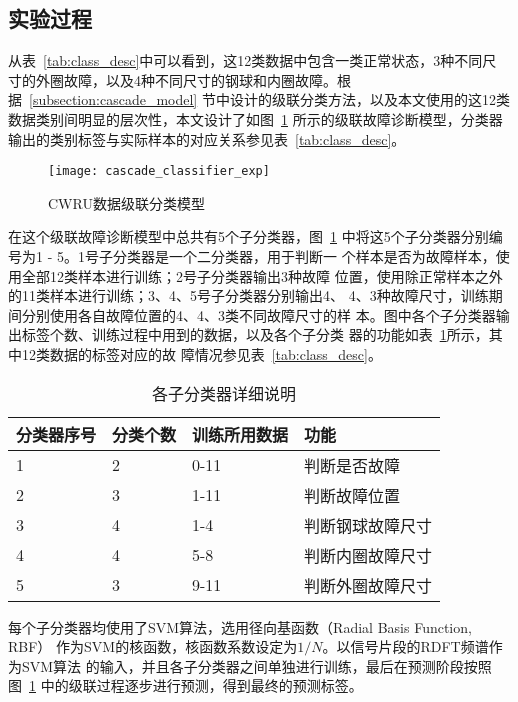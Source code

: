 \subsection{实验过程}

从表~\ref{tab:class_desc}中可以看到，这12类数据中包含一类正常状态，3种不同尺
寸的外圈故障，以及4种不同尺寸的钢球和内圈故障。根据~\ref{subsection:cascade_model}
节中设计的级联分类方法，以及本文使用的这12类数据类别间明显的层次性，本文设计了如图~\ref{fig:cascade_classifier_exp}
所示的级联故障诊断模型，分类器输出的类别标签与实际样本的对应关系参见表~\ref{tab:class_desc}。
\begin{figure}[ht]
  \centering
  \texttt{[image: cascade\_classifier\_exp]}
  \caption{CWRU数据级联分类模型}
  \label{fig:cascade_classifier_exp}
\end{figure}

在这个级联故障诊断模型中总共有5个子分类器，图~\ref{fig:cascade_classifier_exp}
中将这5个子分类器分别编号为1 - 5。1号子分类器是一个二分类器，用于判断一
个样本是否为故障样本，使用全部12类样本进行训练；2号子分类器输出3种故障
位置，使用除正常样本之外的11类样本进行训练；3、4、5号子分类器分别输出4、
4、3种故障尺寸，训练期间分别使用各自故障位置的4、4、3类不同故障尺寸的样
本。图中各个子分类器输出标签个数、训练过程中用到的数据，以及各个子分类
器的功能如表~\ref{tab:classifier_desc}所示，其中12类数据的标签对应的故
障情况参见表~\ref{tab:class_desc}。
\begin{table}[htb]
  \centering
  \begin{minipage}[t]{0.8\linewidth}
  \caption{各子分类器详细说明}
  \label{tab:classifier_desc}
    \begin{tabularx}{\linewidth}{lXXX}
      \toprule[1.5pt]
      分类器序号 & 分类个数 & 训练所用数据 & 功能 \\\midrule[1pt]
      1 & 2 & 0-11 & 判断是否故障\\
      2 & 3 & 1-11 & 判断故障位置\\
      3 & 4 & 1-4 & 判断钢球故障尺寸\\
      4 & 4 & 5-8 & 判断内圈故障尺寸\\
      5 & 3 & 9-11 & 判断外圈故障尺寸\\
      \bottomrule[1.5pt]
    \end{tabularx}
  \end{minipage}
\end{table}

每个子分类器均使用了SVM算法，选用径向基函数（Radial Basis Function, RBF）
作为SVM的核函数，核函数系数设定为$1/N$。以信号片段的RDFT频谱作为SVM算法
的输入，并且各子分类器之间单独进行训练，最后在预测阶段按照图~\ref{fig:cascade_classifier_exp}
中的级联过程逐步进行预测，得到最终的预测标签。

